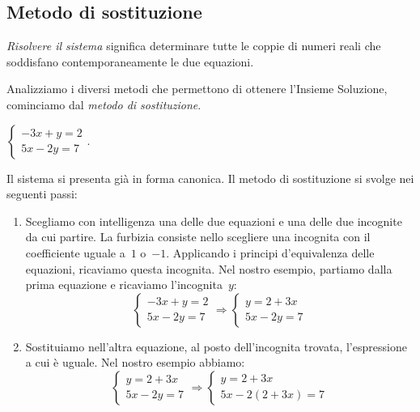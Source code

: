 \subsection{Metodo di sostituzione}
\emph{Risolvere il sistema} significa determinare tutte le coppie di
numeri reali che soddisfano contemporaneamente le due equazioni.

Analizziamo i diversi metodi che permettono di ottenere
l'Insieme Soluzione, cominciamo dal \emph{metodo di sostituzione}.

\begin{exrig}
\begin{esempio}
$\left\{\begin{array}{l}-3x+y=2\\5x-2y=7\end{array}\right.$.
\end{esempio}

Il sistema si presenta già in forma canonica. Il metodo di
sostituzione si svolge nei seguenti passi:

\begin{enumerate}
 \item Scegliamo con intelligenza una delle due equazioni e una
delle due incognite da cui partire. 
La furbizia consiste nello scegliere una incognita con il coefficiente uguale 
a~$1$ o~$-1$.
Applicando i principi d'equivalenza delle equazioni, ricaviamo questa
incognita.
Nel nostro esempio, partiamo dalla prima equazione e ricaviamo
l'incognita~$y$:
\[\left\{\begin{array}{l}
     -3x+y=2\\
     5x-2y=7
    \end{array}
\right.
\Rightarrow
\left\{\begin{array}{l}y=2+3x \\
         5x-2y=7
\end{array}\right.\]

 \item Sostituiamo nell'altra equazione, al posto
dell'incognita trovata, l'espressione a cui è uguale. 
Nel nostro esempio abbiamo:
\[\left\{\begin{array}{l}
     y=2+3x\\
     5x-2y=7
    \end{array}
\right.
\Rightarrow
\left\{\begin{array}{l}y=2+3x \\
         5x-2(2+3x)=7
\end{array}\right.\]


\end{enumerate}
\end{exrig}
